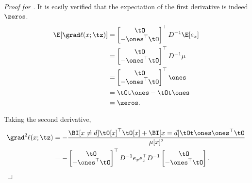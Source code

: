 \begin{proof}[Proof for ]
It is easily verified that the expectation of the first derivative is indeed $\zeros$.
\begin{align*}
  \E[\grad \ell(x; \tz)]
  &= 
  \begin{bmatrix}
    \tO \\
    -\ones^\top \tO
  \end{bmatrix}^\top
  D^{-1} \E[e_x] \\
  &= 
  \begin{bmatrix}
    \tO \\
    -\ones^\top \tO
  \end{bmatrix}^\top
  D^{-1} \mu \\
  &= 
  \begin{bmatrix}
    \tO \\
    -\ones^\top \tO
  \end{bmatrix}^\top
  \ones \\
  &= \tOt\ones - \tOt\ones \\
  &= \zeros.
\end{align*}

Taking the second derivative,
\begin{align}
  \grad^2 \ell(x; \tz)
  &= -\frac{\BI[x \neq d] \tO[x]^\top \tO[x] + \BI[x = d] \tOt \ones \ones^\top \tO}{\mu[x]^2} \nonumber \\
  &= - 
  \begin{bmatrix}
    \tO \\
    -\ones^\top \tO
  \end{bmatrix}^\top
    D^{-1} e_x e_x^\top D^{-1} 
  \begin{bmatrix}
    \tO \\
    -\ones^\top \tO
  \end{bmatrix}. \label{eqn:lhood-hess}%
\end{align}


\end{proof}
